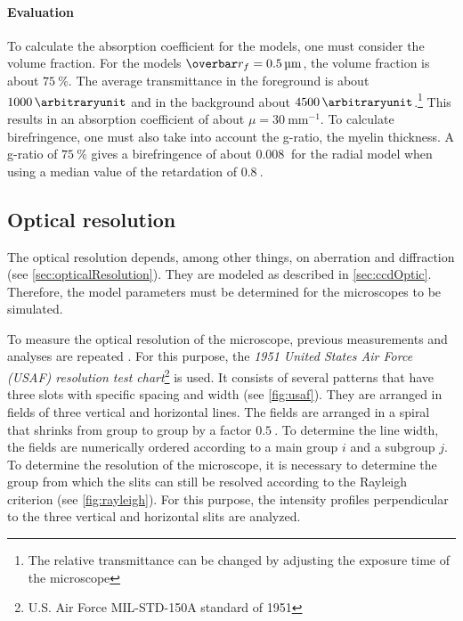 \paragraph{Evaluation}
To calculate the absorption coefficient for the models, one must consider the volume fraction.
For the models $\fiberRadiusMean = \SI{0.5}{\micro\meter}$, the volume fraction is about $\SI{75}{\percent}$.
The average transmittance in the foreground is about $\SI{1000}{\arbitraryunit}$ and in the background about $\SI{4500}{\arbitraryunit}$.\footnote{The relative transmittance can be changed by adjusting the exposure time of the microscope}
This results in an absorption coefficient of about $\mu = \SI{30}{\milli\meter\tothe{-1}}$.
To calculate birefringence, one must also take into account the g-ratio, \ie{} the myelin thickness.
A g-ratio of $\SI{75}{\percent}$ gives a birefringence of about $\SI{0.008}{}$ for the radial model when using a median value of the retardation of $\SI{0.8}{}$.
%
% 
% 
\subsection{Optical resolution}
%
The optical resolution depends, among other things, on aberration and diffraction (see \cref{sec:opticalResolution}).
They are modeled as described in \cref{sec:ccdOptic}.
Therefore, the model parameters must be determined for the microscopes to be simulated.
\par
%
To measure the optical resolution of the microscope, previous measurements and analyses are repeated \cite{MenzelMaster}.
For this purpose, the \textit{1951 United States Air Force (USAF) resolution test chart}\footnote{U.S. Air Force MIL-STD-150A standard of 1951} is used.
It consists of several patterns that have three slots with specific spacing and width (see \cref{fig:usaf}).
They are arranged in fields of three vertical and horizontal lines.
The fields are arranged in a spiral that shrinks from group to group by a factor $\SI{0.5}{}$.
To determine the line width, the fields are numerically ordered according to a main group $i$ and a subgroup $j$.
To determine the resolution of the microscope, it is necessary to determine the group from which the slits can still be resolved according to the Rayleigh criterion (see \cref{fig:rayleigh}).
For this purpose, the intensity profiles perpendicular to the three vertical and horizontal slits are analyzed.
% 
